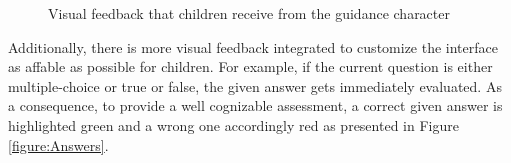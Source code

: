 \begin{figure}[!ht]
{        \label{subfigure:HelperError}
    }
    \qquad
    \caption[
        Visual feedback that children receive from the guidance character  %
    ]{
        Visual feedback that children receive from the guidance character
    }
    \label{figure:HelperFeedback}
\end{figure}
Additionally, there is more visual feedback integrated to customize the interface as affable as possible for children. For example, if the current question is either multiple-choice or true or false, the given answer gets immediately evaluated. As a consequence, to provide a well cognizable assessment, a correct given answer is highlighted green and a wrong one accordingly red as presented in Figure \ref{figure:Answers}.\\
